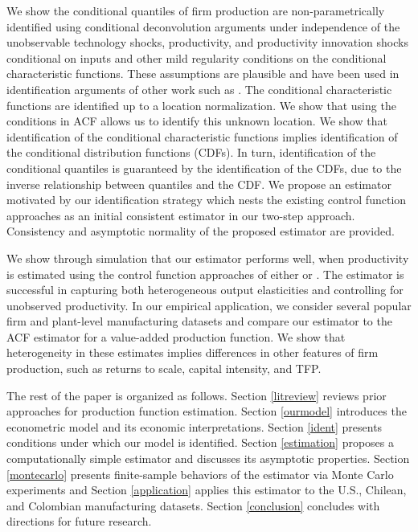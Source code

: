 \documentclass[12pt]{article}
\begin{document}
We show the conditional quantiles of firm production are non-parametrically identified using conditional deconvolution arguments under independence of the unobservable technology shocks, productivity, and productivity innovation shocks conditional on inputs and other mild regularity conditions on the conditional characteristic functions. These assumptions are plausible and have been used in identification arguments of other work such as \cite{Hu2019}. The conditional characteristic functions are identified up to a location normalization. We show that using the conditions in ACF allows us to identify this unknown location. We show that identification of the conditional characteristic functions implies identification of the conditional distribution functions (CDFs). In turn,  identification of the conditional quantiles is guaranteed by the identification of the CDFs, due to the inverse relationship between quantiles and the CDF.  We propose an estimator motivated by our identification strategy which nests the existing control function approaches as an initial consistent estimator in our two-step approach. Consistency and asymptotic normality of the proposed estimator are provided.

We show through simulation that our estimator performs well, when productivity is estimated using the control function approaches of either \cite{Ackerberg2015} or \cite{Levinsohn2003}. The estimator is successful in capturing  both heterogeneous output elasticities and controlling for unobserved productivity. In our empirical application, we consider several popular firm and plant-level manufacturing datasets and compare our estimator to the ACF estimator for a value-added production function. We show that heterogeneity in these estimates implies differences in other features of firm production, such as returns to scale, capital intensity, and TFP.

The rest of the paper is organized as follows. Section \ref{litreview} reviews prior approaches for production function estimation. Section \ref{ourmodel} introduces the econometric model and its economic interpretations. Section \ref{ident} presents conditions under which our model is identified. Section \ref{estimation} proposes a computationally simple estimator and discusses its asymptotic properties. Section \ref{montecarlo} presents finite-sample behaviors of the estimator via Monte Carlo experiments and Section \ref{application} applies this estimator to the U.S., Chilean, and Colombian manufacturing datasets. Section \ref{conclusion} concludes with directions for future research.
\end{document}
